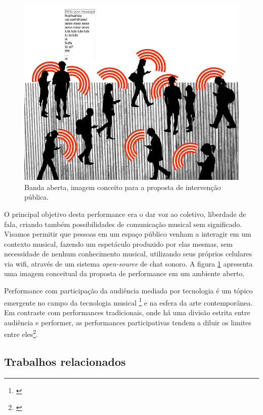 \begin{figure}
    \caption{\label{bandaabertamob}Banda aberta, imagem conceito para a proposta de intervenção pública.}
    \begin{center}
    \includegraphics[width=1\linewidth]{pictures/banda_aberta_mob_crowd.png}
    \end{center}
\end{figure}

O principal objetivo desta performance era o dar voz ao coletivo, liberdade de fala, criando também possibilidades de comunicação musical sem significado. Visamos permitir que pessoas em um espaço público venham a interagir em um contexto musical, fazendo um espetáculo produzido por elas mesmas, sem necessidade de nenhum conhecimento musical, utilizando seus próprios celulares via wifi, através de um sistema \emph{open-source} de chat sonoro. A figura \ref{bandaabertamob} apresenta uma imagem conceitual da proposta de performance em um ambiente aberto. 

Performance com participação da audiência mediada por tecnologia é um tópico emergente no campo da tecnologia musical \footnote{\cite{wu2017open}} e na esfera da arte contemporânea. Em contraste com performances tradicionais, onde há uma divisão estrita entre audiência e performer, as performances participativas tendem a diluir os limites entre eles\footnote{\cite{kattwinkel2003audience}}. 

\subsection{Trabalhos relacionados}

